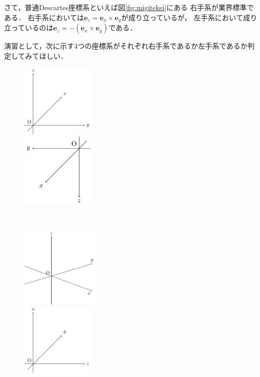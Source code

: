 さて，普通Descartes座標系といえば図\ref{fig:migitekei}にある
右手系が業界標準である．
右手系においては$\bm{e}_z=\bm{e}_x \times \bm{e}_y$が成り立っているが，
左手系において成り立っているのは$\bm{e}_z = -( \bm{e}_x \times \bm{e}_y )$である．

演習として，次に示す4つの座標系がそれぞれ右手系であるか左手系であるか判定してみてほしい．
\begin{figure}[h]
 \begin{minipage}{0.5\hsize}
  \begin{center}
   \includegraphics[width=3.5cm]{picture/vecter17}
  \end{center}
\end{minipage}
\begin{minipage}{0.5\hsize}
  \begin{center}
   \includegraphics[width=3.5cm]{picture/vecter18}
  \end{center}
\end{minipage}
\end{figure}
\\
\begin{figure}[h]
 \begin{minipage}{0.5\hsize}
  \begin{center}
   \includegraphics[width=3.7cm]{picture/vecter19}
  \end{center}
\end{minipage}
\begin{minipage}{0.5\hsize}
  \begin{center}
   \includegraphics[width=3.5cm]{picture/vecter20}
  \end{center}
\end{minipage}
\end{figure}


